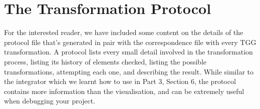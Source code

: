 \newpage

\section{The Transformation Protocol}

\genHeader

For the interested reader, we have included some content on the details of the protocol file that's generated in pair with the correspondence file with every
TGG transformation. A protocol lists every small detail involved in the transformation process, listing its history of elements checked, listing the possible
transformations, attempting each one, and describing the result. While similar to the integrator which we learnt how to use in Part 3, Section 6, the protocol
contains more information than the visualisation, and can be extremely useful when debugging your project.
